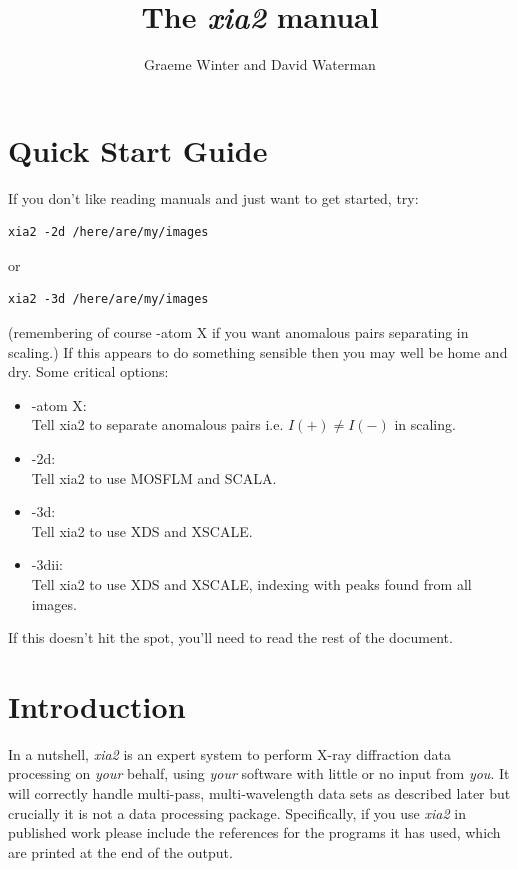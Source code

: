 \documentclass[a4paper, 11pt]{article}
\title{The \emph{xia2} manual}
\author{Graeme Winter and David Waterman}
\begin{document}
\maketitle
\clearpage

\tableofcontents

\clearpage

\section{Quick Start Guide}

If you don't like reading manuals and just want to get started, try:

\begin{verbatim}
xia2 -2d /here/are/my/images
\end{verbatim}

\noindent
or

\begin{verbatim}
xia2 -3d /here/are/my/images
\end{verbatim}

\noindent
(remembering of course -atom X if you want anomalous pairs separating
in scaling.) If this appears to do something sensible then you may
well be home and dry. Some critical options:

\begin{itemize}
\item{-atom X: \\
Tell xia2 to separate anomalous pairs i.e. $I(+) \ne I(-)$ in scaling.}
\item{-2d: \\
Tell xia2 to use MOSFLM and SCALA.}
\item{-3d: \\
Tell xia2 to use XDS and XSCALE.}
\item{-3dii: \\
Tell xia2 to use XDS and XSCALE, indexing with peaks found from all images.}
\end{itemize}

If this doesn't hit the spot, you'll need to read the rest of the document.

\clearpage

\section{Introduction}

In a nutshell, \emph{xia2} is an expert system to perform X-ray diffraction
data processing on \emph{your} behalf, using \emph{your} software with little
or no input from \emph{you}. It will correctly handle multi-pass, 
multi-wavelength data sets as described later but crucially it is not a
data processing package. Specifically, if you use \emph{xia2} in published
work please include the references for the programs it has used, which are
printed at the end of the output.
\end{document}
